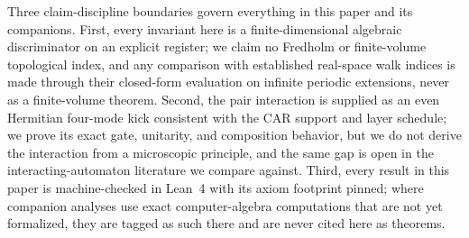 \documentclass[11pt]{article}
\begin{document}
Three claim-discipline boundaries govern everything in this paper and its
companions.  First, every invariant here is a finite-dimensional algebraic
discriminator on an explicit register; we claim no Fredholm or
finite-volume topological index, and any comparison with established
real-space walk indices is made through their closed-form evaluation on
infinite periodic extensions, never as a finite-volume theorem.  Second,
the pair interaction is supplied as an even Hermitian four-mode kick
consistent with the CAR support and layer schedule; we prove its exact
gate, unitarity, and composition behavior, but we do not derive the
interaction from a microscopic principle, and the same gap is open in the
interacting-automaton literature we compare against.  Third, every result
in this paper is machine-checked in Lean~4 with its axiom footprint
pinned; where companion analyses use exact computer-algebra computations
that are not yet formalized, they are tagged as such there and are never
cited here as theorems.
\end{document}
